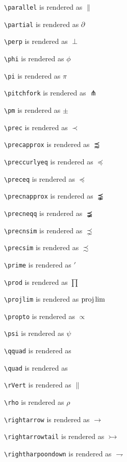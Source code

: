\texttt{\textbackslash parallel} is rendered as $\parallel$

\texttt{\textbackslash partial} is rendered as $\partial$

\texttt{\textbackslash perp} is rendered as $\perp$

\texttt{\textbackslash phi} is rendered as $\phi$

\texttt{\textbackslash pi} is rendered as $\pi$

\texttt{\textbackslash pitchfork} is rendered as $\pitchfork$

\texttt{\textbackslash pm} is rendered as $\pm$

\texttt{\textbackslash prec} is rendered as $\prec$

\texttt{\textbackslash precapprox} is rendered as $\precapprox$

\texttt{\textbackslash preccurlyeq} is rendered as $\preccurlyeq$

\texttt{\textbackslash preceq} is rendered as $\preceq$

\texttt{\textbackslash precnapprox} is rendered as $\precnapprox$

\texttt{\textbackslash precneqq} is rendered as $\precneqq$

\texttt{\textbackslash precnsim} is rendered as $\precnsim$

\texttt{\textbackslash precsim} is rendered as $\precsim$

\texttt{\textbackslash prime} is rendered as $\prime$

\texttt{\textbackslash prod} is rendered as $\prod$

\texttt{\textbackslash projlim} is rendered as $\projlim$

\texttt{\textbackslash propto} is rendered as $\propto$

\texttt{\textbackslash psi} is rendered as $\psi$

\texttt{\textbackslash qquad} is rendered as $\qquad$

\texttt{\textbackslash quad} is rendered as $\quad$

\texttt{\textbackslash rVert} is rendered as $\rVert$

\texttt{\textbackslash rho} is rendered as $\rho$

\texttt{\textbackslash rightarrow} is rendered as $\rightarrow$

\texttt{\textbackslash rightarrowtail} is rendered as $\rightarrowtail$

\texttt{\textbackslash rightharpoondown} is rendered as $\rightharpoondown$

